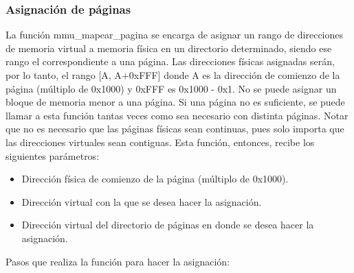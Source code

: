 \subsubsection{Asignación de páginas}
La función mmu\_mapear\_pagina se encarga de asignar un rango de direcciones de memoria virtual a memoria física en un directorio determinado, siendo ese rango el correspondiente a una página. Las direcciones físicas asignadas serán, por lo tanto, el rango [A, A+0xFFF] donde A es la dirección de comienzo de la página (múltiplo de 0x1000) y 0xFFF es 0x1000 - 0x1. No se puede asignar un bloque de memoria menor a una página. Si una página no es suficiente, se puede llamar a esta función tantas veces como sea necesario con distinta páginas. Notar que no es necesario que las páginas físicas sean continuas, pues solo importa que las direcciones virtuales sean contiguas.\newline 
Esta función, entonces, recibe los siguientes parámetros:
\begin{itemize}
\item Dirección física de comienzo de la página (múltiplo de 0x1000).
\item Dirección virtual con la que se desea hacer la asignación.
\item Dirección virtual del directorio de páginas en donde se desea hacer la asignación.
\end{itemize}
Pasos que realiza la función para hacer la asignación:
